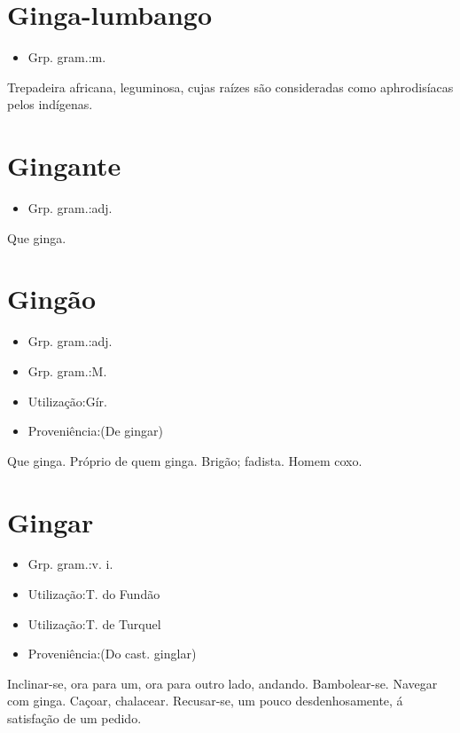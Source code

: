 \section{Ginga-lumbango}
\begin{itemize}
\item {Grp. gram.:m.}
\end{itemize}
Trepadeira africana, leguminosa, cujas raízes são consideradas como aphrodisíacas pelos indígenas.
\section{Gingante}
\begin{itemize}
\item {Grp. gram.:adj.}
\end{itemize}
Que ginga.
\section{Gingão}
\begin{itemize}
\item {Grp. gram.:adj.}
\end{itemize}
\begin{itemize}
\item {Grp. gram.:M.}
\end{itemize}
\begin{itemize}
\item {Utilização:Gír.}
\end{itemize}
\begin{itemize}
\item {Proveniência:(De \textunderscore gingar\textunderscore )}
\end{itemize}
Que ginga.
Próprio de quem ginga.
Brigão; fadista.
Homem coxo.
\section{Gingar}
\begin{itemize}
\item {Grp. gram.:v. i.}
\end{itemize}
\begin{itemize}
\item {Utilização:T. do Fundão}
\end{itemize}
\begin{itemize}
\item {Utilização:T. de Turquel}
\end{itemize}
\begin{itemize}
\item {Proveniência:(Do cast. \textunderscore ginglar\textunderscore )}
\end{itemize}
Inclinar-se, ora para um, ora para outro lado, andando.
Bambolear-se.
Navegar com ginga.
Caçoar, chalacear.
Recusar-se, um pouco desdenhosamente, á satisfação de um pedido.
